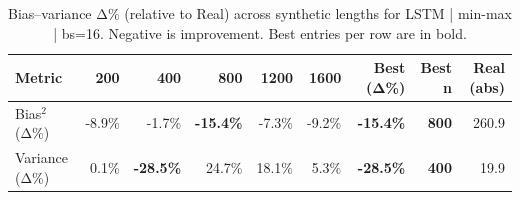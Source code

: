 \renewcommand{\arraystretch}{1.2}
\begin{table}[!t]
\centering
\footnotesize
\caption{Bias–variance Δ\% (relative to Real) across synthetic lengths for LSTM | min-max | bs=16. Negative is improvement. Best entries per row are in bold.}
\label{tab:bvdelta_LSTM_min-max_bs16}
\setlength{\tabcolsep}{5pt}
\begin{tabular}{lrrrrrrrr}
\toprule
Metric & 200 & 400 & 800 & 1200 & 1600 & Best (Δ\%) & Best n & Real (abs) \\
\midrule
Bias$^2$ (Δ\%) & -8.9\% & -1.7\% & \textbf{-15.4\%} & -7.3\% & -9.2\% & \textbf{-15.4\%} & \textbf{800} & 260.9 \\
Variance (Δ\%) & 0.1\% & \textbf{-28.5\%} & 24.7\% & 18.1\% & 5.3\% & \textbf{-28.5\%} & \textbf{400} & 19.9 \\
\bottomrule
\end{tabular}

\end{table}
